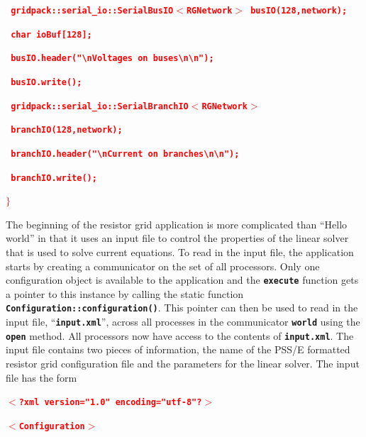 \documentclass[12pt]{report} %
\begin{document}
\textcolor{red}{\texttt{\textbf{  gridpack::serial\_io::SerialBusIO$\boldsymbol{\mathrm{<}}$RGNetwork$\boldsymbol{\mathrm{>}}$ busIO(128,network);}}}

\textcolor{red}{\texttt{\textbf{  char ioBuf[128];}}}

\textcolor{red}{\texttt{\textbf{  busIO.header("{\textbackslash}nVoltages on buses{\textbackslash}n{\textbackslash}n");}}}

\textcolor{red}{\texttt{\textbf{  busIO.write();}}}

\textcolor{red}{\texttt{\textbf{}}}

\textcolor{red}{\texttt{\textbf{  gridpack::serial\_io::SerialBranchIO$\boldsymbol{\mathrm{<}}$RGNetwork$\boldsymbol{\mathrm{>}}$}}}

\textcolor{red}{\texttt{\textbf{    branchIO(128,network);}}}

\textcolor{red}{\texttt{\textbf{  branchIO.header("{\textbackslash}nCurrent on branches{\textbackslash}n{\textbackslash}n");}}}

\textcolor{red}{\texttt{\textbf{  branchIO.write();}}}

\textcolor{red}{\texttt{\textbf{$\boldsymbol{\mathrm{\}}}$}}}

The beginning of the resistor grid application is more complicated than ``Hello world'' in that it uses an input file to control the properties of the linear solver that is used to solve current equations. To read in the input file, the application starts by creating a communicator on the set of all processors. Only one configuration object is available to the application and the \texttt{\textbf{execute}} function gets a pointer to this instance by calling the static function \texttt{\textbf{Configuration::configuration()}}. This pointer can then be used to read in the input file, ``\texttt{\textbf{input.xml}}'', across all processes in the communicator \texttt{\textbf{world}} using the \texttt{\textbf{open}} method. All processors now have access to the contents of \texttt{\textbf{input.xml}}. The input file contains two pieces of information, the name of the PSS/E formatted resistor grid configuration file and the parameters for the linear solver. The input file has the form

\textcolor{red}{\texttt{\textbf{$\boldsymbol{\mathrm{<}}$?xml version="1.0" encoding="utf-8"?$\boldsymbol{\mathrm{>}}$}}}

\textcolor{red}{\texttt{\textbf{$\boldsymbol{\mathrm{<}}$Configuration$\boldsymbol{\mathrm{>}}$}}}
\end{document}
